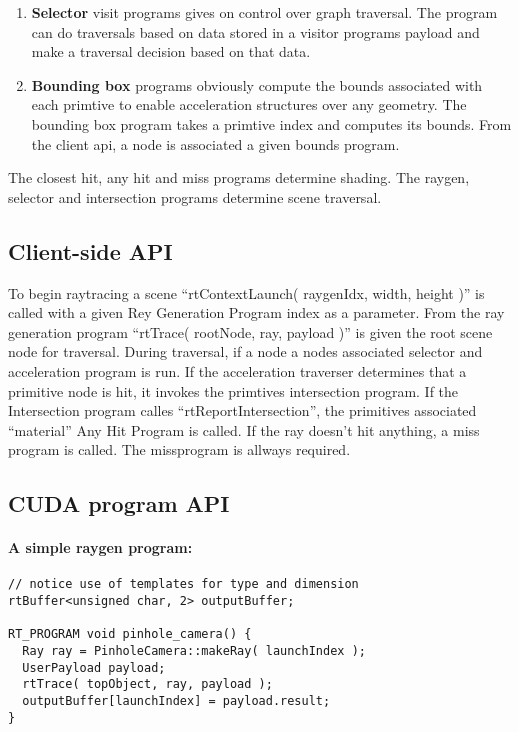 \begin{enumerate}
	\item{\textbf{Selector}
								visit programs gives on control over graph traversal.
								The program can do traversals based on data stored in a visitor programs payload and make a traversal decision based 	on that data.}

 \item{\textbf{Bounding box}
 							 programs obviously compute the bounds associated with each primtive to enable acceleration structures over any geometry.
 							 The bounding box program takes a primtive index and computes its bounds. From the client api, a node is associated a given bounds program. }
 				
\end{enumerate}

The closest hit, any hit and miss programs determine shading. The raygen, selector and intersection programs determine scene traversal.
			 
\subsection{Client-side API}

To begin raytracing a scene ``rtContextLaunch( raygenIdx, width, height )'' is called with a given Rey Generation Program index as a parameter. From the ray generation program ``rtTrace( rootNode, ray, payload )'' is given the root scene node for traversal. During traversal, if a node a nodes associated selector and acceleration program is run.
If the acceleration traverser determines that a primitive node is hit, it invokes the primtives intersection program.
If the Intersection program calles ``rtReportIntersection'', the primitives associated ``material'' Any Hit Program is called.
If the ray doesn't hit anything, a miss program is called. The missprogram is allways required.

\subsection{CUDA program API}

\paragraph{A simple raygen program:}

\begin{verbatim}
// notice use of templates for type and dimension
rtBuffer<unsigned char, 2> outputBuffer; 

RT_PROGRAM void pinhole_camera() {
  Ray ray = PinholeCamera::makeRay( launchIndex );
  UserPayload payload;
  rtTrace( topObject, ray, payload );
  outputBuffer[launchIndex] = payload.result;
}
\end{verbatim}
